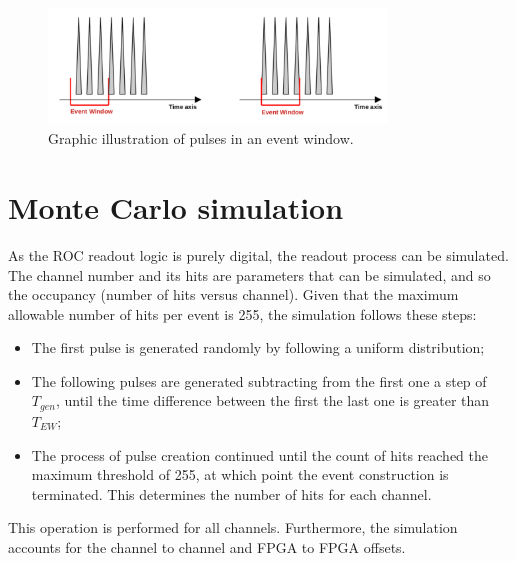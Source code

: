 \begin{figure}[!h]
\centering
\includegraphics[width =0.8\textwidth]{figures/pdf/eventwindow}
\caption{Graphic illustration of pulses in an event window.}
\label{fig:3}
\end{figure}
\section{Monte Carlo simulation}\label{MonteCarlo}
 
As the ROC readout logic is purely digital, the readout process can be simulated.
The channel number and its hits are parameters that can be simulated, and so the occupancy (number of hits versus channel).
Given that the maximum allowable number of hits per event is 255, the simulation follows these steps:
\begin{itemize}
  \item The first pulse is generated randomly by following a uniform distribution;
    \item The following pulses are generated subtracting from the first one a step of $T_{gen}$, until the time difference between the 
first the last one is greater than $T_{EW}$;
  \item The process of pulse creation continued until the count of hits reached the maximum threshold of 255,
 at which point the event construction is terminated. This determines the number of hits for each channel.
\end{itemize}
This operation is performed for all channels.
Furthermore, the simulation accounts for the channel to channel and FPGA to FPGA offsets. 




